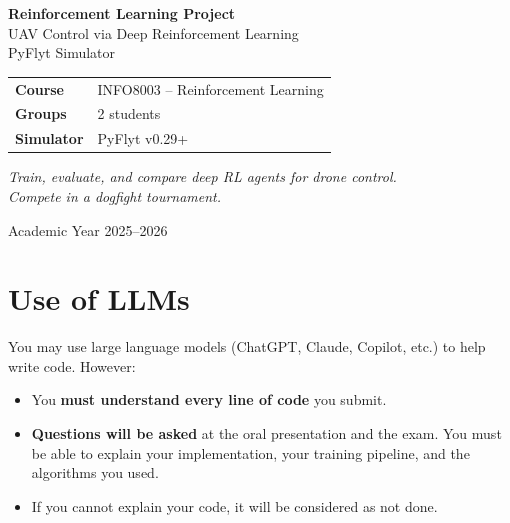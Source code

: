 \documentclass[11pt,a4paper]{article}
\begin{document}
\begin{titlepage}
\centering
\vspace*{3cm}

{\Huge\bfseries Reinforcement Learning Project}\\[0.8cm]
{\LARGE UAV Control via Deep Reinforcement Learning}\\[0.5cm]
{\Large PyFlyt Simulator}\\[2cm]

\begin{tabular}{ll}
\toprule
\textbf{Course}     & INFO8003 -- Reinforcement Learning \\
\textbf{Groups}     & 2 students \\
\textbf{Simulator}  & PyFlyt v0.29+ \cite{tai2023pyflyt} \\
\bottomrule
\end{tabular}

\vspace{2cm}
\textit{Train, evaluate, and compare deep RL agents for drone control.\\
Compete in a dogfight tournament.}

\vfill
{\large Academic Year 2025--2026}
\end{titlepage}

\tableofcontents
\newpage

\section*{Use of LLMs}

You may use large language models (ChatGPT, Claude, Copilot, etc.) to help write code. However:
\begin{itemize}[nosep]
  \item You \textbf{must understand every line of code} you submit.
  \item \textbf{Questions will be asked} at the oral presentation and the exam. You must be able to explain your implementation, your training pipeline, and the algorithms you used.
  \item If you cannot explain your code, it will be considered as not done.
\end{itemize}
\end{document}
